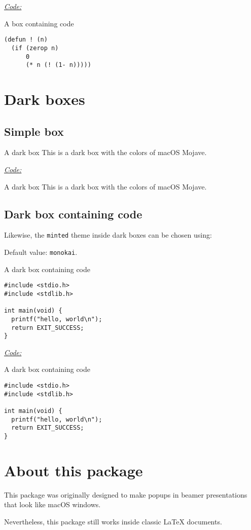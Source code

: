 \documentclass[a4paper]{article}
\newcommand{\code}[1][Code]{\medskip\underline{\textit{\large{}#1:}}}
\begin{document}
\code
\begin{latexcode}
\begin{macosbox}{A box containing code}
\begin{verbatim}
(defun ! (n)
  (if (zerop n)
      0
      (* n (! (1- n)))))
\end{verbatim}
\end{macosbox}
\end{latexcode}

\section{Dark boxes}
\subsection{Simple box}
\begin{macosdarkbox}{A dark box}
  This is a dark box with the colors of macOS Mojave.
\end{macosdarkbox}

\code
\begin{latexcode}
\begin{macosdarkbox}{A dark box}
  This is a dark box with the colors of macOS Mojave.
\end{macosdarkbox}
\end{latexcode}

\subsection{Dark box containing code}
Likewise, the \texttt{minted} theme inside dark boxes can be chosen using:

\begin{latexcode}
\end{latexcode}

Default value: \texttt{monokai}.

\begin{macosdarkbox}{A dark box containing code}
\begin{verbatim}
#include <stdio.h>
#include <stdlib.h>

int main(void) {
  printf("hello, world\n");
  return EXIT_SUCCESS;
}
\end{verbatim}
\end{macosdarkbox}

\code
\begin{latexcode}
\begin{macosdarkbox}{A dark box containing code}
\begin{verbatim}
#include <stdio.h>
#include <stdlib.h>

int main(void) {
  printf("hello, world\n");
  return EXIT_SUCCESS;
}
\end{verbatim}
\end{macosdarkbox}
\end{latexcode}

\section{About this package}
This package was originally designed to make popups in beamer presentations that
look like macOS windows.

Nevertheless, this package still works inside classic \LaTeX{} documents.
\end{document}
